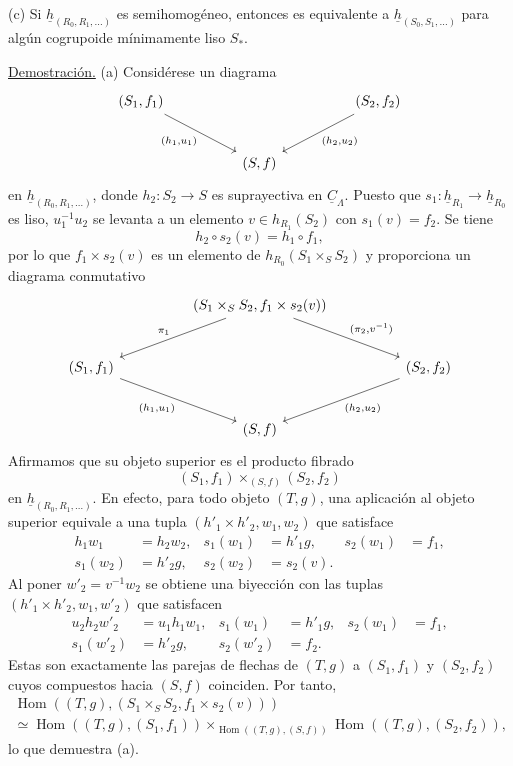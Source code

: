 (c) Si $\underline h_{(R_0,R_1,\ldots)}$ es semihomogéneo, entonces
es equivalente a $\underline h_{(S_0,S_1,\ldots)}$ para algún cogrupoide
mínimamente liso $S_*$.

\underline{Demostración.} (a) Considérese un diagrama
\[
\begin{tikzcd}[column sep=huge,row sep=large]
 (S_1,f_1) \arrow[dr,"{(h_1,u_1)}"']
 && (S_2,f_2) \arrow[dl,"{(h_2,u_2)}"]\\
 & (S,f) &
\end{tikzcd}
\]
en $\underline h_{(R_0,R_1,\ldots)}$, donde
$h_2:S_2\longrightarrow S$ es suprayectiva en
$\underline C_\Lambda$. Puesto que
$s_1:\underline h_{R_1}\longrightarrow\underline h_{R_0}$ es
liso, $u_1^{-1}u_2$ se levanta a un elemento $v\in h_{R_1}(S_2)$ con
$s_1(v)=f_2$. Se tiene
\[
 h_2\circ s_2(v)=h_1\circ f_1,
\]
por lo que $f_1\times s_2(v)$ es un elemento de
$h_{R_0}(S_1\times_SS_2)$ y proporciona un diagrama conmutativo
\[
\begin{tikzcd}[column sep=huge,row sep=large]
 & (S_1\times_SS_2,f_1\times s_2(v))
   \arrow[dl,"{\pi_1}"']
   \arrow[dr,"{(\pi_2,v^{-1})}"] &\\
 (S_1,f_1) \arrow[dr,"{(h_1,u_1)}"']
 && (S_2,f_2) \arrow[dl,"{(h_2,u_2)}"]\\
 & (S,f) &
\end{tikzcd}
\]
Afirmamos que su objeto superior es el producto fibrado
\[
 (S_1,f_1)\times_{(S,f)}(S_2,f_2)
\]
en $\underline h_{(R_0,R_1,\ldots)}$. En efecto, para todo objeto
$(T,g)$, una aplicación al objeto superior equivale a una tupla
$(h'_1\times h'_2,w_1,w_2)$ que satisface
\begin{align*}
 h_1w_1&=h_2w_2,&
 s_1(w_1)&=h'_1g,&s_2(w_1)&=f_1,\\
 s_1(w_2)&=h'_2g,&
 s_2(w_2)&=s_2(v).
\end{align*}
Al poner $w'_2=v^{-1}w_2$ se obtiene una biyección con las tuplas
$(h'_1\times h'_2,w_1,w'_2)$ que satisfacen
\begin{align*}
 u_2h_2w'_2&=u_1h_1w_1,&
 s_1(w_1)&=h'_1g,&s_2(w_1)&=f_1,\\
 s_1(w'_2)&=h'_2g,&
 s_2(w'_2)&=f_2.
\end{align*}
Estas son exactamente las parejas de flechas de $(T,g)$ a $(S_1,f_1)$
y $(S_2,f_2)$ cuyos compuestos hacia $(S,f)$ coinciden. Por tanto,
\begin{multline*}
 \operatorname{Hom}((T,g),(S_1\times_SS_2,
                 f_1\times s_2(v)))\\
 \simeq
 \operatorname{Hom}((T,g),(S_1,f_1))
 \times_{\operatorname{Hom}((T,g),(S,f))}
 \operatorname{Hom}((T,g),(S_2,f_2)),
\end{multline*}
lo que demuestra (a).

